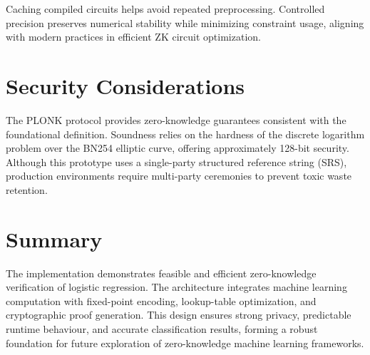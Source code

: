 Caching compiled circuits helps avoid repeated preprocessing. Controlled precision preserves numerical stability while minimizing constraint usage, aligning with modern practices in efficient ZK circuit optimization.

\section{Security Considerations}

The PLONK protocol provides zero-knowledge guarantees consistent with the foundational definition. Soundness relies on the hardness of the discrete logarithm problem over the BN254 elliptic curve, offering approximately 128-bit security. Although this prototype uses a single-party structured reference string (SRS), production environments require multi-party ceremonies to prevent toxic waste retention.

\section{Summary}

The implementation demonstrates feasible and efficient zero-knowledge verification of logistic regression. The architecture integrates machine learning computation with fixed-point encoding, lookup-table optimization, and cryptographic proof generation. This design ensures strong privacy, predictable runtime behaviour, and accurate classification results, forming a robust foundation for future exploration of zero-knowledge machine learning frameworks.
